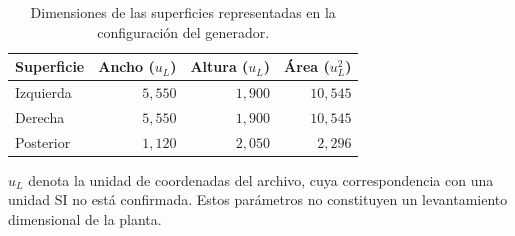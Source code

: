 \begin{table}[htbp]
\centering
\caption{Dimensiones de las superficies representadas en la configuración del generador.}
\label{tab:res_geometria}
\small
\setlength{\tabcolsep}{5pt}
\begin{tabular}{lrrr}
\toprule
Superficie & Ancho ($u_L$) & Altura ($u_L$) & Área ($u_L^2$) \\
\midrule
Izquierda & $5{,}550$ & $1{,}900$ & $10{,}545$ \\
Derecha & $5{,}550$ & $1{,}900$ & $10{,}545$ \\
Posterior & $1{,}120$ & $2{,}050$ & $2{,}296$ \\
\bottomrule
\end{tabular}
\par\vspace{3pt}
\begin{minipage}{0.98\textwidth}\footnotesize
$u_L$ denota la unidad de coordenadas del archivo, cuya correspondencia con una unidad SI no está confirmada. Estos parámetros no constituyen un levantamiento dimensional de la planta.
\end{minipage}
\end{table}
